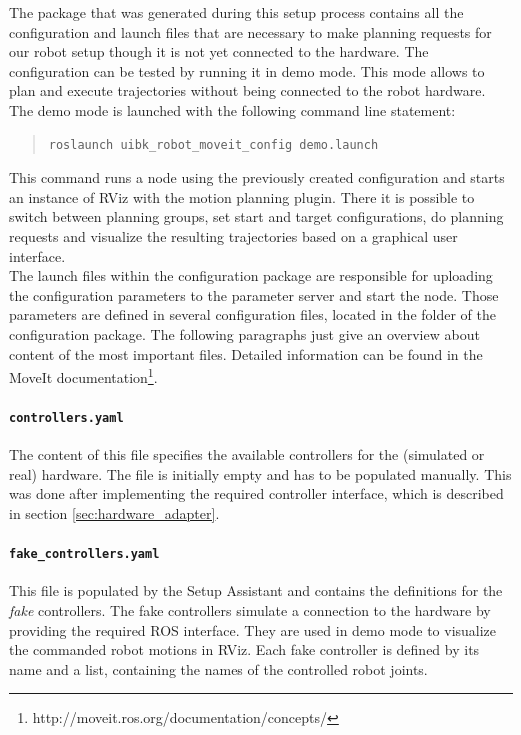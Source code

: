 The package that was generated during this setup process contains all the configuration and launch files that are necessary to make planning requests for our robot setup though it is not yet connected to the hardware. The configuration can be tested by running it in demo mode. This mode allows to plan and execute trajectories without being connected to the robot hardware. The demo mode is launched with the following command line statement:
\begin{quote}
\begin{verbatim}
roslaunch uibk_robot_moveit_config demo.launch
\end{verbatim}
\end{quote}
This command runs a  node using the previously created configuration and starts an instance of RViz with the motion planning plugin. There it is possible to switch between planning groups, set start and target configurations, do planning requests and visualize the resulting trajectories based on a graphical user interface. \\

The launch files within the configuration package are responsible for uploading the configuration parameters to the parameter server and start the  node. Those parameters are defined in several configuration files, located in the  folder of the configuration package. The following paragraphs just give an overview about content of the most important files. Detailed information can be found in the MoveIt documentation\footnote{http://moveit.ros.org/documentation/concepts/}.

\paragraph{\texttt{controllers.yaml}}
The content of this file specifies the available controllers for the (simulated or real) hardware. The file is initially empty and has to be populated manually. This was done after implementing the required controller interface, which is described in section \ref{sec:hardware_adapter}.

\paragraph{\texttt{fake\_controllers.yaml}}
This file is populated by the Setup Assistant and contains the definitions for the \emph{fake} controllers. The fake controllers simulate a connection to the hardware by providing the required ROS interface. They are used in demo mode to visualize the commanded robot motions in RViz. Each fake controller is defined by its name and a list, containing the names of the controlled robot joints.

